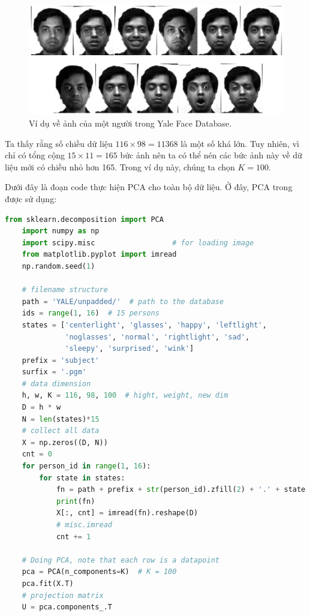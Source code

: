 \begin{figure}[t]
    \centering
    \includegraphics[width = \textwidth]{Chapters/content/28_pca2/latex/yaleb_exs.pdf}
    \caption[]{Ví dụ về ảnh của một người trong Yale Face Database.}
    \label{fig:28_1}
\end{figure}

Ta thấy rằng số chiều dữ liệu $116 \times 98 = 11368$ là một số khá
lớn. Tuy nhiên, vì chỉ có tổng cộng $15 \times 11 = 165$ bức ảnh nên ta có thể
nén các bức ảnh này về dữ liệu mới có chiều nhỏ hơn 165. Trong ví dụ này, chúng
ta chọn $K = 100$.

Dưới đây là đoạn code thực hiện PCA cho toàn bộ dữ liệu. Ở đây, PCA trong  được sử dụng:
\newpage
\begin{lstlisting}[language=Python]
    from sklearn.decomposition import PCA
    import numpy as np
    import scipy.misc                  # for loading image
    from matplotlib.pyplot import imread
    np.random.seed(1)
    
    # filename structure
    path = 'YALE/unpadded/'  # path to the database
    ids = range(1, 16)  # 15 persons
    states = ['centerlight', 'glasses', 'happy', 'leftlight',
              'noglasses', 'normal', 'rightlight', 'sad',
              'sleepy', 'surprised', 'wink']
    prefix = 'subject'
    surfix = '.pgm'
    # data dimension
    h, w, K = 116, 98, 100  # hight, weight, new dim
    D = h * w
    N = len(states)*15
    # collect all data
    X = np.zeros((D, N))
    cnt = 0
    for person_id in range(1, 16):
        for state in states:
            fn = path + prefix + str(person_id).zfill(2) + '.' + state + surfix
            print(fn)
            X[:, cnt] = imread(fn).reshape(D)
            # misc.imread
            cnt += 1
    
    # Doing PCA, note that each row is a datapoint
    pca = PCA(n_components=K)  # K = 100
    pca.fit(X.T)
    # projection matrix
    U = pca.components_.T
    
\end{lstlisting}

